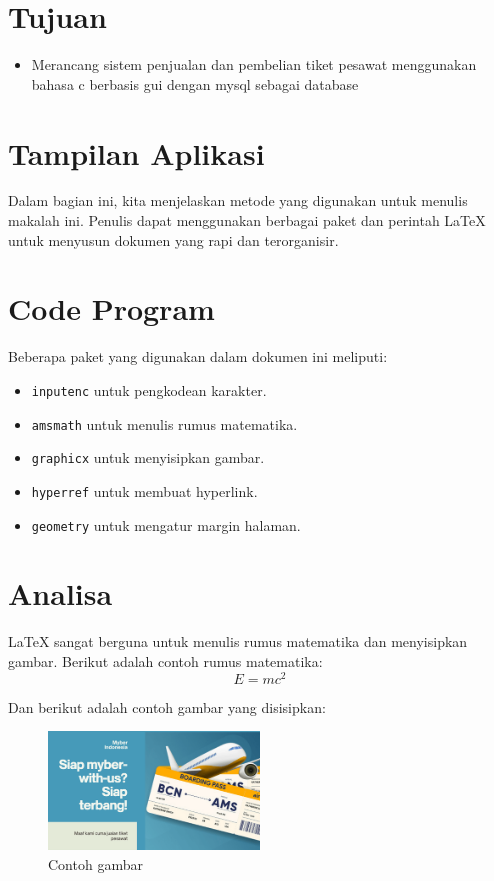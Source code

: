 \documentclass[a4paper,12pt]{report}
\begin{document}
\section{Tujuan}
\label{sec:intro}

\begin{itemize}
    \item  Merancang sistem penjualan dan pembelian tiket pesawat menggunakan bahasa c berbasis gui dengan mysql sebagai database
\end{itemize}

\section{Tampilan Aplikasi}

Dalam bagian ini, kita menjelaskan metode yang digunakan untuk menulis makalah ini. Penulis dapat menggunakan berbagai paket dan perintah LaTeX untuk menyusun dokumen yang rapi dan terorganisir.

\section{Code Program}
Beberapa paket yang digunakan dalam dokumen ini meliputi:
\begin{itemize}
    \item \texttt{inputenc} untuk pengkodean karakter.
    \item \texttt{amsmath} untuk menulis rumus matematika.
    \item \texttt{graphicx} untuk menyisipkan gambar.
    \item \texttt{hyperref} untuk membuat hyperlink.
    \item \texttt{geometry} untuk mengatur margin halaman.
\end{itemize}

\section{Analisa}

LaTeX sangat berguna untuk menulis rumus matematika dan menyisipkan gambar. Berikut adalah contoh rumus matematika:
\begin{equation}
E = mc^2
\end{equation}

Dan berikut adalah contoh gambar yang disisipkan:
\begin{figure}[h]
    \centering
    \includegraphics[width=0.5\textwidth]{../assets/banner.png}
    \caption{Contoh gambar}
    \label{fig:example}
\end{figure}
\end{document}
